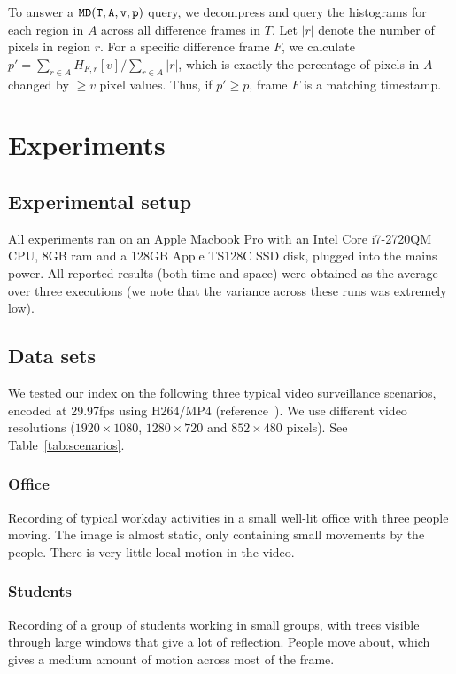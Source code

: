 To answer a $\mathtt{MD(T, A, v, p)}$ query, we decompress and query the histograms for each region in $A$ across all difference frames in $T$. Let $|r|$ denote the number of pixels in region $r$. For a specific difference frame $F$, we calculate $p' = \sum_{r \in A} H_{F,r}[v] / \sum_{r \in A} |r|$, which is exactly the percentage of pixels in $A$ changed by $\geq v$ pixel values. Thus, if $p' \geq p$, frame $F$ is a matching timestamp.


\section{Experiments}

\subsection{Experimental setup}
All experiments ran on an Apple Macbook Pro with an Intel Core i7-2720QM CPU, 8GB ram and a 128GB Apple TS128C SSD disk, plugged into the mains power. All reported results (both time and space) were obtained as the average over three executions (we note that the variance across these runs was extremely low).

\subsection{Data sets}
We tested our index on the following three typical video surveillance scenarios, encoded at 29.97fps using H264/MP4 (reference~\cite{sourcecode}). We use different video resolutions ($1920\times1080$, $1280\times720$ and $852\times480$ pixels). See Table~\ref{tab:scenarios}.

\subsubsection{Office}
Recording of typical workday activities in a small well-lit office with three people moving. The image is almost static, only containing small movements by the people. There is very little local motion in the video.

\subsubsection{Students}
Recording of a group of students working in small groups, with trees visible through large windows that give a lot of reflection. People move about, which gives a medium amount of motion across most of the frame.

